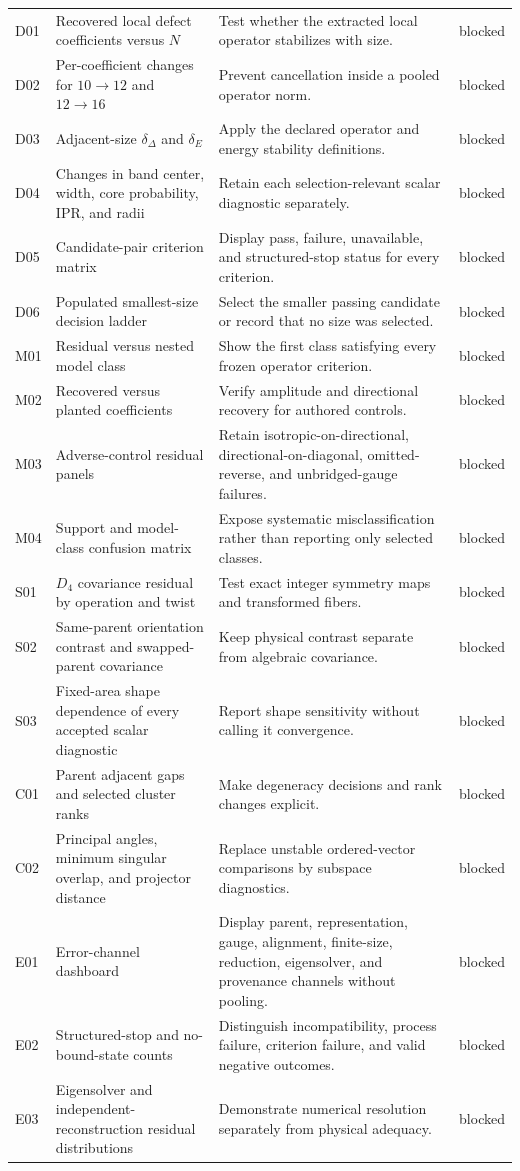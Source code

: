 \documentclass[11pt]{article}
\begin{document}
\begin{longtable}{@{}L{10mm}L{42mm}L{65mm}L{18mm}@{}}
D01 & Recovered local defect coefficients versus $N$ & Test whether the extracted local
operator stabilizes with size. & blocked \\
D02 & Per-coefficient changes for $10\to12$ and $12\to16$ & Prevent cancellation inside
a pooled operator norm. & blocked \\
D03 & Adjacent-size $\delta_{\Delta}$ and $\delta_E$ & Apply the declared operator and
energy stability definitions. & blocked \\
D04 & Changes in band center, width, core probability, IPR, and radii & Retain each
selection-relevant scalar diagnostic separately. & blocked \\
D05 & Candidate-pair criterion matrix & Display pass, failure, unavailable, and
structured-stop status for every criterion. & blocked \\
D06 & Populated smallest-size decision ladder & Select the smaller passing candidate or
record that no size was selected. & blocked \\
M01 & Residual versus nested model class & Show the first class satisfying every frozen
operator criterion. & blocked \\
M02 & Recovered versus planted coefficients & Verify amplitude and directional recovery
for authored controls. & blocked \\
M03 & Adverse-control residual panels & Retain isotropic-on-directional,
directional-on-diagonal, omitted-reverse, and unbridged-gauge failures. & blocked \\
M04 & Support and model-class confusion matrix & Expose systematic misclassification
rather than reporting only selected classes. & blocked \\
S01 & $D_4$ covariance residual by operation and twist & Test exact integer symmetry
maps and transformed fibers. & blocked \\
S02 & Same-parent orientation contrast and swapped-parent covariance & Keep physical
contrast separate from algebraic covariance. & blocked \\
S03 & Fixed-area shape dependence of every accepted scalar diagnostic & Report shape
sensitivity without calling it convergence. & blocked \\
C01 & Parent adjacent gaps and selected cluster ranks & Make degeneracy decisions and
rank changes explicit. & blocked \\
C02 & Principal angles, minimum singular overlap, and projector distance & Replace
unstable ordered-vector comparisons by subspace diagnostics. & blocked \\
E01 & Error-channel dashboard & Display parent, representation, gauge, alignment,
finite-size, reduction, eigensolver, and provenance channels without pooling. & blocked \\
E02 & Structured-stop and no-bound-state counts & Distinguish incompatibility, process
failure, criterion failure, and valid negative outcomes. & blocked \\
E03 & Eigensolver and independent-reconstruction residual distributions & Demonstrate
numerical resolution separately from physical adequacy. & blocked \\
\bottomrule
\end{longtable}
\end{document}
